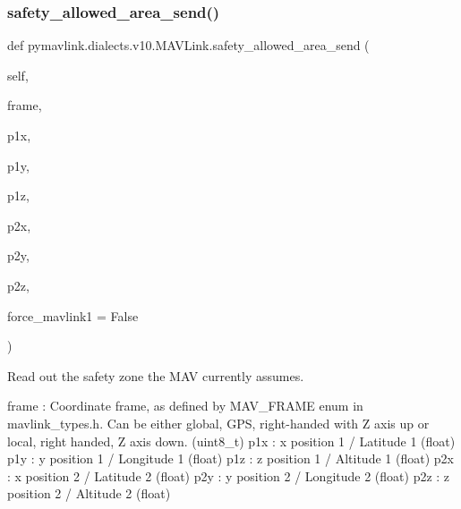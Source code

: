 \begin{DoxyVerb}
\begin{DoxyVerb}
\begin{DoxyVerb}
\begin{DoxyVerb}
\begin{DoxyVerb}
\begin{DoxyVerb}
\begin{DoxyVerb}
\begin{DoxyVerb}
\begin{DoxyVerb}
\begin{DoxyVerb}
\subsubsection{\texorpdfstring{safety\+\_\+allowed\+\_\+area\+\_\+send()}{safety\_allowed\_area\_send()}}
{\footnotesize\ttfamily def pymavlink.\+dialects.\+v10.\+M\+A\+V\+Link.\+safety\+\_\+allowed\+\_\+area\+\_\+send (\begin{DoxyParamCaption}\item[{}]{self,  }\item[{}]{frame,  }\item[{}]{p1x,  }\item[{}]{p1y,  }\item[{}]{p1z,  }\item[{}]{p2x,  }\item[{}]{p2y,  }\item[{}]{p2z,  }\item[{}]{force\+\_\+mavlink1 = {\ttfamily False} }\end{DoxyParamCaption})}

\begin{DoxyVerb}Read out the safety zone the MAV currently assumes.

frame                     : Coordinate frame, as defined by MAV_FRAME enum in mavlink_types.h. Can be either global, GPS, right-handed with Z axis up or local, right handed, Z axis down. (uint8_t)
p1x                       : x position 1 / Latitude 1 (float)
p1y                       : y position 1 / Longitude 1 (float)
p1z                       : z position 1 / Altitude 1 (float)
p2x                       : x position 2 / Latitude 2 (float)
p2y                       : y position 2 / Longitude 2 (float)
p2z                       : z position 2 / Altitude 2 (float)\end{DoxyVerb}
 \mbox{\label{classpymavlink_1_1dialects_1_1v10_1_1MAVLink_a320b484260a0e9388364b6a0676368c9}} 

\end{DoxyVerb}
\end{DoxyVerb}
\end{DoxyVerb}
\end{DoxyVerb}
\end{DoxyVerb}
\end{DoxyVerb}
\end{DoxyVerb}
\end{DoxyVerb}
\end{DoxyVerb}
\end{DoxyVerb}
